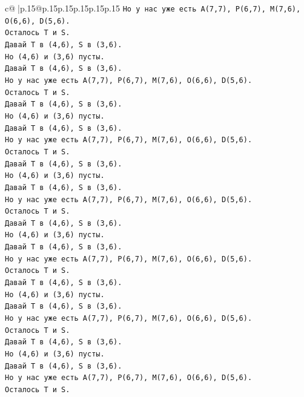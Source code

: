 \documentclass{article}
\begin{document}
{\begin{supertabular}{c@{$\;$}|p{.15\linewidth}@{}p{.15\linewidth}p{.15\linewidth}p{.15\linewidth}p{.15\linewidth}p{.15\linewidth}}
{{{\texttt{Но у нас уже есть A(7,7), P(6,7), M(7,6), O(6,6), D(5,6).} \\
\texttt{Осталось T и S.} \\
\texttt{Давай T в (4,6), S в (3,6).} \\
\texttt{Но (4,6) и (3,6) пусты.} \\
\texttt{Давай T в (4,6), S в (3,6).} \\
\texttt{Но у нас уже есть A(7,7), P(6,7), M(7,6), O(6,6), D(5,6).} \\
\texttt{Осталось T и S.} \\
\texttt{Давай T в (4,6), S в (3,6).} \\
\texttt{Но (4,6) и (3,6) пусты.} \\
\texttt{Давай T в (4,6), S в (3,6).} \\
\texttt{Но у нас уже есть A(7,7), P(6,7), M(7,6), O(6,6), D(5,6).} \\
\texttt{Осталось T и S.} \\
\texttt{Давай T в (4,6), S в (3,6).} \\
\texttt{Но (4,6) и (3,6) пусты.} \\
\texttt{Давай T в (4,6), S в (3,6).} \\
\texttt{Но у нас уже есть A(7,7), P(6,7), M(7,6), O(6,6), D(5,6).} \\
\texttt{Осталось T и S.} \\
\texttt{Давай T в (4,6), S в (3,6).} \\
\texttt{Но (4,6) и (3,6) пусты.} \\
\texttt{Давай T в (4,6), S в (3,6).} \\
\texttt{Но у нас уже есть A(7,7), P(6,7), M(7,6), O(6,6), D(5,6).} \\
\texttt{Осталось T и S.} \\
\texttt{Давай T в (4,6), S в (3,6).} \\
\texttt{Но (4,6) и (3,6) пусты.} \\
\texttt{Давай T в (4,6), S в (3,6).} \\
\texttt{Но у нас уже есть A(7,7), P(6,7), M(7,6), O(6,6), D(5,6).} \\
\texttt{Осталось T и S.} \\
\texttt{Давай T в (4,6), S в (3,6).} \\
\texttt{Но (4,6) и (3,6) пусты.} \\
\texttt{Давай T в (4,6), S в (3,6).} \\
\texttt{Но у нас уже есть A(7,7), P(6,7), M(7,6), O(6,6), D(5,6).} \\
\texttt{Осталось T и S.} \\
}}}
\end{supertabular}}
\end{document}
